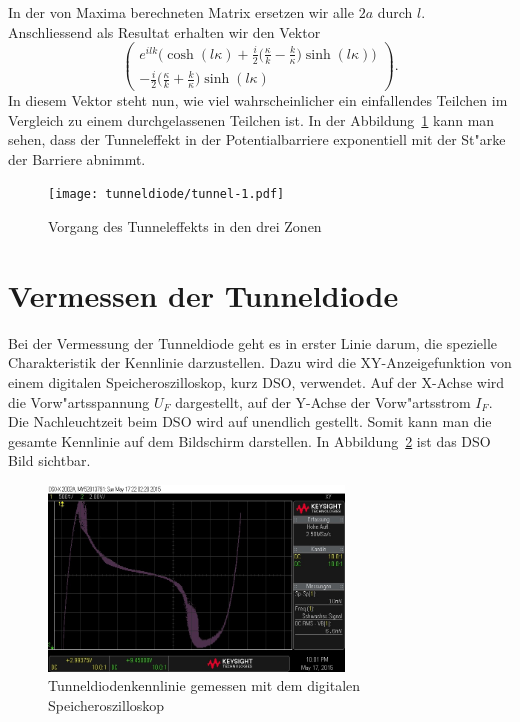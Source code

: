 \begin{refsection}
In der von Maxima berechneten Matrix ersetzen wir alle $2a$ durch $l$. 
Anschliessend als Resultat erhalten wir den Vektor
\[
\begin{pmatrix}
\displaystyle
e^{ilk}\biggl(\cosh(l\kappa)
+\frac{i}{2}\biggl(\frac{\kappa}{k}-\frac{k}{\kappa}\biggr)\sinh(l\kappa)
\biggr)
\\
\displaystyle
- \frac{i}{2}
\biggl(\frac{\kappa}{k}+\frac{k}{\kappa}\biggr)
\sinh(l\kappa)
\end{pmatrix}.
\]
In diesem Vektor steht nun, wie viel wahrscheinlicher ein einfallendes Teilchen im Vergleich zu einem durchgelassenen Teilchen ist.
In der Abbildung~\ref{tunnel:Tunneleffekt} kann man sehen, dass der Tunneleffekt in der Potentialbarriere exponentiell mit der St"arke der Barriere abnimmt.

\begin{figure}	%
\centering
\texttt{[image: tunneldiode/tunnel-1.pdf]}
\caption{Vorgang des Tunneleffekts in den drei Zonen
\label{tunnel:Tunneleffekt}}
\end{figure}

\section{Vermessen der Tunneldiode}

Bei der Vermessung der Tunneldiode geht es in erster Linie darum, die spezielle Charakteristik der Kennlinie darzustellen. 
Dazu wird die XY-Anzeigefunktion von einem digitalen Speicheroszilloskop, kurz DSO, verwendet. 
Auf der X-Achse wird die Vorw"artsspannung $U_F$ dargestellt, auf der Y-Achse der Vorw"artsstrom $I_F$. 
Die Nachleuchtzeit beim DSO wird auf unendlich gestellt. 
Somit kann man die gesamte Kennlinie auf dem Bildschirm darstellen. 
In Abbildung~\ref{tunnel:KennlinieDSO} ist das DSO Bild sichtbar.

\begin{figure}	%
\centering
\includegraphics[width=0.7\textwidth]{tunneldiode/images/Kennlinie_DSO.jpg}
\caption{Tunneldiodenkennlinie gemessen mit dem digitalen Speicheroszilloskop
\label{tunnel:KennlinieDSO}}
\end{figure}


\end{refsection}
